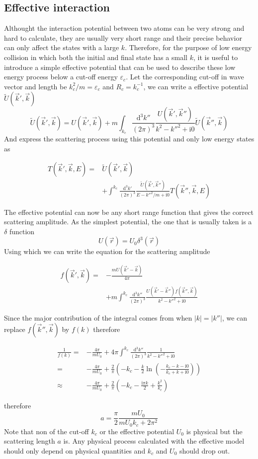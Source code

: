 \documentclass[aps,twocolumn,secnumarabic,balancelastpage,amsmath,amssymb,nofootinbib]{revtex4}
\newcommand{\ud}{\mathrm{d}}
\newcommand{\ui}{\mathrm{i}}
\newcommand{\eqar}[1]
{
  \begin{align*}
    #1
  \end{align*}
}
\newcommand{\paren}[1]{{\left({#1}\right)}}
\newcommand{\abs}[1]{{\left|{#1}\right|}}
\begin{document}
\subsection{Effective interaction}
Althought the interaction potential between two atoms can be very strong and hard to calculate, they are usually very short range and their precise behavior can only affect the states with a large $k$. Therefore, for the purpose of low energy collision in which both the initial and final state has a small $k$, it is useful to introduce a simple effective potential that can be used to describe these low energy process below a cut-off energy $\varepsilon_c$. Let the corresponding cut-off in wave vector and length be $k_c^2/m=\varepsilon_c$ and $R_c=k_c^{-1}$, we can write a effective potential $\tilde U\paren{\vec k', \vec k}$
\[\tilde U\paren{\vec k', \vec k}=U\paren{\vec k', \vec k}+m\int_{k_c}\!\!\frac{\ud^3 k''}{\paren{2\pi}^3}\frac{U\paren{\vec k', \vec k''}}{k^2-k''^2+\ui 0}\tilde U\paren{\vec k'', \vec k}\]
And express the scattering process using this potential and only low energy states as
\eqar{
  T\paren{\vec k', \vec k, E}=&\tilde U\paren{\vec k', \vec k}\\
  &+\int^{k_c}\!\!\frac{\ud^3 k'}{\paren{2\pi}^3}\frac{\tilde U\paren{\vec k', \vec k''}}{E-k''^2/m+\ui0}T\paren{\vec k'', \vec k, E}
}
The effective potential can now be any short range function that gives the correct scattering amplitude. As the simplest potential, the one that is usually taken is a $\delta$ function
\[U\paren{\vec r}=U_0\delta^3\paren{\vec r}\]
Using which we can write the equation for the scattering amplitude
\eqar{
  f\paren{\vec k', \vec k}=&-\frac{mU\paren{\vec k'-\vec k}}{4\pi}\\
  &+m\int^{k_c}\!\!\frac{\ud^3k''}{\paren{2\pi}^3}\frac{U\paren{\vec k'-\vec k''}f\paren{\vec k'',\vec k}}{k^2-k''^2+\ui0}
}
Since the major contribution of the integral comes from when $\abs{k}=\abs{k''}$, we can replace $f\paren{\vec k'', \vec k}$ by $f\paren{k}$ therefore
\eqar{
  \frac{1}{f\paren{k}}=&-\frac{4\pi}{mU_0}+4\pi\int^{k_c}\frac{\ud^3k''}{\paren{2\pi}^3}\frac{1}{k^2-k''^2+\ui0}\\
  =&-\frac{4\pi}{mU_0}+\frac{2}{\pi}\paren{-k_c-\frac{k}{2}\ln\paren{-\frac{k_c-k-\ui0}{k_c+k+\ui0}}}\\
  \approx&-\frac{4\pi}{mU_0}+\frac{2}{\pi}\paren{-k_c-\frac{\ui\pi k}{2}+\frac{k^2}{k_c}}
}
therefore
\[a=\frac{\pi}{2}\frac{mU_0}{mU_0k_c+2\pi^2}\]
Note that non of the cut-off $k_c$ or the effective potential $U_0$ is physical but the scattering length $a$ is. Any physical process calculated with the effective model should only depend on physical quantities and $k_c$ and $U_0$ should drop out.
\end{document}
